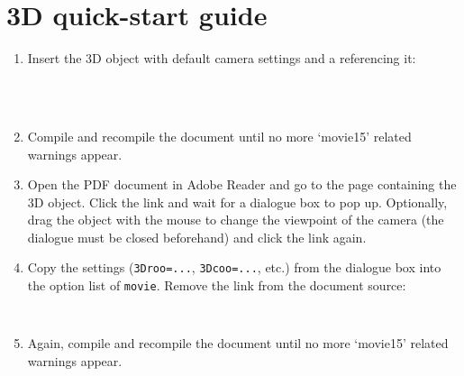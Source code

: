 \documentclass[a4paper]{article}
\begin{document}
\section{3D quick-start guide}\hypertarget{sec:3Dtut}{}
\begin{enumerate}
  \item Insert the 3D object with default camera settings and a {\tt \string\movieref} referencing it:

  {\tt%
    \string{}\string{\\
    \phantom{xx}.5\string\linewidth\\
    \string}\string{\\
    \phantom{xx}.5\string\linewidth\\
    \string}\string\\\\
    \string\movieref[3Dcalculate]
  }

  \item Compile and recompile the document until no more `movie15' related warnings appear.
  \item Open the PDF document in Adobe Reader and go to the page containing the 3D object. Click the link and wait for a dialogue box to pop up. Optionally, drag the object with the mouse to change the viewpoint of the camera (the dialogue must be closed beforehand) and click the link again.
  \item Copy the settings ({\tt 3Droo=...}, {\tt 3Dcoo=...}, etc.) from the dialogue box into the option list of {\tt \string\-movie}. Remove the link from the document source:

  {\tt%
    \string{}\string{\\
    \phantom{xx}.5\string\linewidth\\
    \string}\string{\\
    \phantom{xx}.5\string\linewidth\\
    \string}
  }

  \item Again, compile and recompile the document until no more `movie15' related warnings appear.
  \xdef\lastcount{\theenumi}
\end{enumerate}
\end{document}
